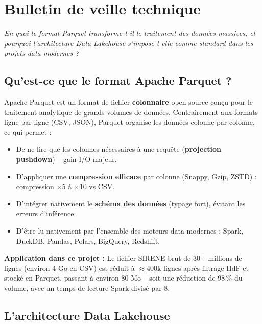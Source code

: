 \documentclass[11pt,a4paper]{article}
\begin{document}
\section{Bulletin de veille technique}

\begin{tcolorbox}[orange, title={Thème : Le format Apache Parquet et l'architecture Data Lakehouse}]
\textit{En quoi le format Parquet transforme-t-il le traitement des données massives, et pourquoi
l'architecture Data Lakehouse s'impose-t-elle comme standard dans les projets data modernes ?}
\end{tcolorbox}

\subsection{Qu'est-ce que le format Apache Parquet ?}

Apache Parquet est un format de fichier \textbf{colonnaire} open-source conçu pour le traitement
analytique de grands volumes de données. Contrairement aux formats ligne par ligne (CSV, JSON),
Parquet organise les données colonne par colonne, ce qui permet :

\begin{itemize}
  \item De ne lire que les colonnes nécessaires à une requête (\textbf{projection pushdown}) -- gain I/O majeur.
  \item D'appliquer une \textbf{compression efficace} par colonne (Snappy, Gzip, ZSTD) : compression ×5 à ×10 vs CSV.
  \item D'intégrer nativement le \textbf{schéma des données} (typage fort), évitant les erreurs d'inférence.
  \item D'être lu nativement par l'ensemble des moteurs data modernes : Spark, DuckDB, Pandas, Polars, BigQuery, Redshift.
\end{itemize}

\textbf{Application dans ce projet :} Le fichier SIRENE brut de 30+ millions de lignes (environ 4 Go en CSV)
est réduit à $\approx$400k lignes après filtrage HdF et stocké en Parquet, passant à environ 80 Mo --
soit une réduction de 98\,\% du volume, avec un temps de lecture Spark divisé par 8.

\subsection{L'architecture Data Lakehouse}
\end{document}
